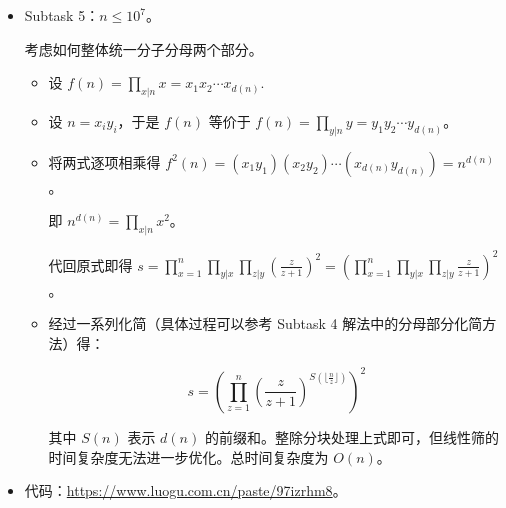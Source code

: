 \documentclass[10pt,aspectratio=43,mathserif]{beamer}
\begin{document}
\begin{frame}

	\begin{itemize} \setlength{\parskip}{0.15\baselineskip}

		\item Subtask 5：$n\leq 10^7$。

		考虑如何整体统一分子分母两个部分。

		\begin{itemize} \setlength{\parskip}{0.15\baselineskip}

			\item 设 $f(n)=\prod_{x|n}x=x_1x_2\cdots x_{d(n)}$.

			\item 设 $n=x_iy_i$，于是 $f(n)$ 等价于 $f(n)=\prod_{y|n}y=y_1y_2\cdots y_{d(n)}$。

			\item 将两式逐项相乘得 $f^2(n)=(x_1y_1)(x_2y_2)\cdots (x_{d(n)}y_{d(n)})=n^{d(n)}$。

			即 $n^{d(n)}=\prod_{x|n}x^2$。

			代回原式即得 $s=\prod_{x=1}^n\prod_{y|x}\prod_{z|y}(\frac z{z+1})^2=(\prod_{x=1}^n\prod_{y|x}\prod_{z|y}\frac z{z+1})^2$。

			\item 经过一系列化简（具体过程可以参考 Subtask 4 解法中的分母部分化简方法）得：
			
			$$s=(\prod_{z=1}^{n}(\frac z{z+1})^{S(\lfloor\frac nz\rfloor)})^2$$
			
			其中 $S(n)$ 表示 $d(n)$ 的前缀和。整除分块处理上式即可，但线性筛的时间复杂度无法进一步优化。总时间复杂度为 $O(n)$。

		\end{itemize}

		\item 代码：\url{https://www.luogu.com.cn/paste/97izrhm8}。

	\end{itemize}

\end{frame}
			
\end{document}
